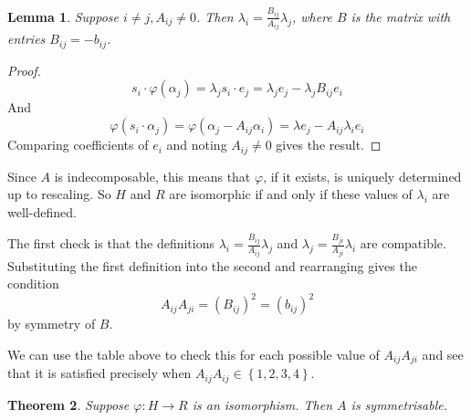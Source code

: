 \documentclass[11pt,a4paper]{report}
\newtheorem{theorem}{Theorem}[chapter]
\newtheorem{lemma}[theorem]{Lemma}
\theoremstyle{definition}
\begin{document}
\begin{lemma} \label{lem:isomorphcond} Suppose $i \neq j, A_{ij} \neq 0$. Then $\lambda_i = \frac{B_{ij}}{A_{ij}} \lambda_j$, where $B$ is the matrix with entries $B_{ij} = -b_{ij}$.\end{lemma}

\begin{proof} \begin{equation*}s_i \cdot \varphi(\alpha_j) = \lambda_j s_i \cdot e_j = \lambda_j e_j - \lambda_j B_{ij} e_i\end{equation*} And \begin{equation*}\varphi(s_i \cdot \alpha_j) = \varphi(\alpha_j - A_{ij} \alpha_i) = \lambda e_j - A_{ij} \lambda_i e_i\end{equation*} Comparing coefficients of $e_i$ and noting $A_{ij} \neq 0$ gives the result. \end{proof}


Since $A$ is indecomposable, this means that $\varphi$, if it exists, is uniquely determined up to rescaling. So $H$ and $R$ are isomorphic if and only if these values of $\lambda_i$ are well-defined. 

The first check is that the definitions $\lambda_i = \frac{B_{ij}}{A_{ij}} \lambda_j$ and $\lambda_j = \frac{B_{ji}}{A_{ji}} \lambda_i$ are compatible. Substituting the first definition into the second and rearranging gives the condition \begin{equation*}A_{ij} A_{ji} = (B_{ij})^2 = (b_{ij})^2\end{equation*} by symmetry of $B$. 

We can use the table above to check this for each possible value of $A_{ij} A_{ji}$ and see that it is satisfied precisely when $A_{ij} A_{ij} \in \left\{1,2,3,4\right\}$. 

\begin{theorem} Suppose $\varphi: H \to R$ is an isomorphism. Then $A$ is symmetrisable. \end{theorem}
\end{document}
